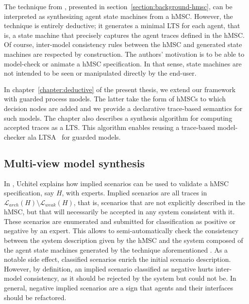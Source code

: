 The technique from \cite{Uchitel:2003}, presented in section~\ref{section:background-hmsc}, can be interpreted as synthesizing agent state machines from a hMSC. However, the technique is entirely deductive; it generates a minimal LTS for each agent, that is, a state machine that precisely captures the agent traces defined in the hMSC. Of course, inter-model consistency rules between the hMSC and generated state machines are respected by construction.  The authors' motivation is to be able to model-check or animate a hMSC specification. In that sense, state machines are not intended to be seen or manipulated directly by the end-user.

In chapter~\ref{chapter:deductive} of the present thesis, we extend our framework with guarded process models. The latter take the form of hMSCs to which decision nodes are added and we provide a declarative trace-based semantics for such models. The chapter also describes a synthesis algorithm for computing accepted traces as a LTS. This algorithm enables reusing a trace-based model-checker ala LTSA~\cite{Magee:1999} for guarded models.

\subsection*{Multi-view model synthesis}

In \cite{Uchitel:2004}, Uchitel explains how implied scenarios can be used to validate a hMSC specification, say $H$, with experts. Implied scenarios are all traces in $\mathcal{L}_{arch}(H) \setminus \mathcal{L}_{weak}(H)$, that is, scenarios that are not explicitly described in the hMSC, but that will necessarily be accepted in any system consistent with it. These scenarios are enumerated and submitted for classification as positive or negative by an expert. This allows to semi-automatically check the consistency between the system description given by the hMSC and the system composed of the agent state machines generated by the technique aforementioned \cite{Uchitel:2003}. As a notable side effect, classified scenarios enrich the initial scenario description. However, by definition, an implied scenario classified as negative hurts inter-model consistency, as it should be rejected by the system but could not be. In general, negative implied scenarios are a sign that agents and their interfaces should be refactored. 

